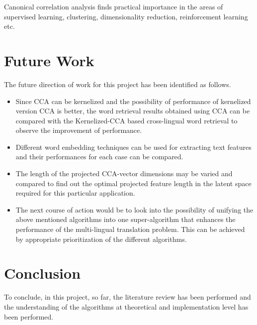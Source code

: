 \documentclass{article} %
\begin{document}
Canonical correlation analysis finds practical importance in the areas of supervised learning, clustering, dimensionality reduction, reinforcement learning etc.


\section{Future Work}
The future direction of work for this project has been identified as follows.
\begin{itemize}
\item Since CCA can be kernelized and the possibility of performance of kernelized version CCA is better, the word retrieval results obtained using CCA can be compared with the Kernelized-CCA based cross-lingual word retrieval to observe the improvement of performance.
\item Different word embedding techniques can be used for extracting text features and their performances for each case can be compared.
\item The length of the projected CCA-vector dimensions may be varied and compared to find out the optimal projected feature length in the latent space required for this particular application.
\item The next course of action would be to look into the possibility of unifying the above mentioned algorithms into one super-algorithm that enhances the performance of the multi-lingual translation problem. This can be achieved by appropriate prioritization of the different algorithms.
\end{itemize}
 




\section{Conclusion}
To conclude, in this project, so far, the literature review has been performed and the understanding of the algorithms at theoretical and implementation level has been performed. 
\end{document}
